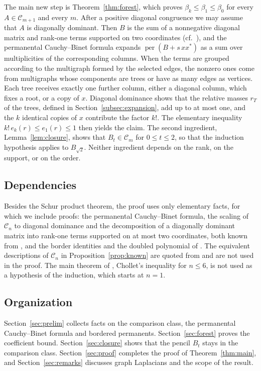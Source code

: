 \documentclass[11pt]{amsart}
\theoremstyle{remark}
\numberwithin{equation}{section}
\newcommand{\per}{\operatorname{per}}
\newcommand{\cC}{\mathcal{C}}
\begin{document}
The main new step is Theorem~\ref{thm:forest}, which proves $\beta_k\le\beta_1\le\beta_0$ for every $A\in\cC_{m+1}$ and every $m$. After a positive diagonal congruence we may assume that $A$ is diagonally dominant. Then $B$ is the sum of a nonnegative diagonal matrix and rank-one terms supported on two coordinates (cf.\ \cite[Lemma~3.7]{SN}), and the permanental Cauchy--Binet formula expands $\per(B+s\,xx^*)$ as a sum over multiplicities of the corresponding columns. When the terms are grouped according to the multigraph formed by the selected edges, the nonzero ones come from multigraphs whose components are trees or have as many edges as vertices. Each tree receives exactly one further column, either a diagonal column, which fixes a root, or a copy of $x$. Diagonal dominance shows that the relative masses $r_T$ of the trees, defined in Section~\ref{subsec:expansion}, add up to at most one, and the $k$ identical copies of $x$ contribute the factor $k!$. The elementary inequality $k!\,e_k(r)\le e_1(r)\le1$ then yields the claim. The second ingredient, Lemma~\ref{lem:closure}, shows that $B_t\in\cC_m$ for $0\le t\le2$, so that the induction hypothesis applies to $B_{\sqrt2}$. Neither ingredient depends on the rank, on the support, or on the order.

\subsection*{Dependencies}
Besides the Schur product theorem, the proof uses only elementary facts, for which we include proofs: the permanental Cauchy--Binet formula, the scaling of $\cC_n$ to diagonal dominance and the decomposition of a diagonally dominant matrix into rank-one terms supported on at most two coordinates, both known from \cite{SN,BCPT}, and the border identities and the doubled polynomial of \cite{LZL}. The equivalent descriptions of $\cC_n$ in Proposition~\ref{prop:known} are quoted from \cite{SN,BCPT} and are not used in the proof. The main theorem of \cite{LZL}, Chollet's inequality for $n\le6$, is not used as a hypothesis of the induction, which starts at $n=1$.

\subsection*{Organization}
Section~\ref{sec:prelim} collects facts on the comparison class, the permanental Cauchy--Binet formula and bordered permanents. Section~\ref{sec:forest} proves the coefficient bound. Section~\ref{sec:closure} shows that the pencil $B_t$ stays in the comparison class. Section~\ref{sec:proof} completes the proof of Theorem~\ref{thm:main}, and Section~\ref{sec:remarks} discusses graph Laplacians and the scope of the result.
\end{document}
